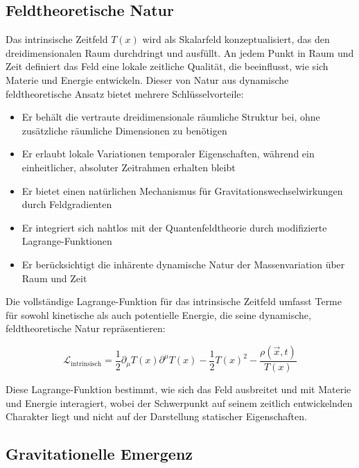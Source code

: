 \documentclass[12pt,a4paper]{article}
\newcommand{\Tfield}{T(x)}
\newcommand{\vecx}{\vec{x}}
\begin{document}
	\subsection{Feldtheoretische Natur}
	\label{subsec:field_theoretic_nature}
	
	Das intrinsische Zeitfeld \(\Tfield\) wird als Skalarfeld konzeptualisiert, das den dreidimensionalen Raum durchdringt und ausfüllt. An jedem Punkt in Raum und Zeit definiert das Feld eine lokale zeitliche Qualität, die beeinflusst, wie sich Materie und Energie entwickeln. Dieser von Natur aus dynamische feldtheoretische Ansatz bietet mehrere Schlüsselvorteile:
	
	\begin{itemize}
		\item Er behält die vertraute dreidimensionale räumliche Struktur bei, ohne zusätzliche räumliche Dimensionen zu benötigen
		\item Er erlaubt lokale Variationen temporaler Eigenschaften, während ein einheitlicher, absoluter Zeitrahmen erhalten bleibt
		\item Er bietet einen natürlichen Mechanismus für Gravitationswechselwirkungen durch Feldgradienten
		\item Er integriert sich nahtlos mit der Quantenfeldtheorie durch modifizierte Lagrange-Funktionen
		\item Er berücksichtigt die inhärente dynamische Natur der Massenvariation über Raum und Zeit
	\end{itemize}
	
	Die vollständige Lagrange-Funktion für das intrinsische Zeitfeld umfasst Terme für sowohl kinetische als auch potentielle Energie, die seine dynamische, feldtheoretische Natur repräsentieren:
	
	\begin{equation}
		\mathcal{L}_{\text{intrinsisch}} = \frac{1}{2}\partial_{\mu}\Tfield\partial^{\mu}\Tfield - \frac{1}{2}\Tfield^2 - \frac{\rho(\vecx,t)}{\Tfield}
	\end{equation}
	
	Diese Lagrange-Funktion bestimmt, wie sich das Feld ausbreitet und mit Materie und Energie interagiert, wobei der Schwerpunkt auf seinem zeitlich entwickelnden Charakter liegt und nicht auf der Darstellung statischer Eigenschaften.
	
	\subsection{Gravitationelle Emergenz}
	\label{subsec:gravitational_emergence_t0}
	
\end{document}
